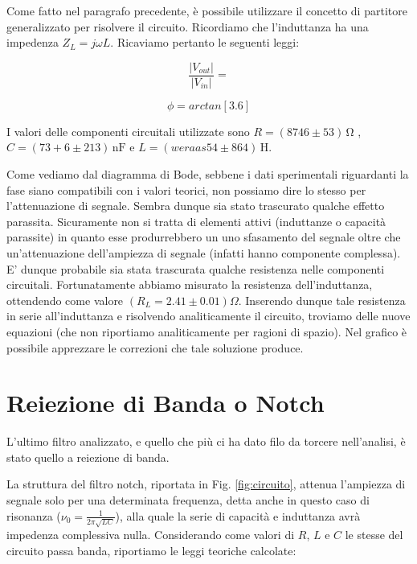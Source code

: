 Come fatto nel paragrafo precedente, è possibile utilizzare il concetto di partitore generalizzato per risolvere il circuito. Ricordiamo che l'induttanza ha una impedenza $Z_L=j\omega L$. Ricaviamo pertanto le seguenti leggi:

\begin{equation}
\frac{|V_{out}|}{|V_{in}|}=
\label{eq:bpfGain}
\end{equation}

\begin{equation}
\phi=arctan[3.6]
\label{eq:bpfPhi}
\end{equation}

I valori delle componenti circuitali utilizzate sono $R=(8746 \pm 53)\,\si{\ohm}$ , $C=(73+6 \pm 213)\,\si{\nano\farad}$ e $L=(weraas54 \pm 864)\,\si{\henry}$.

Come vediamo dal diagramma di Bode, sebbene i dati sperimentali riguardanti la fase siano compatibili con i valori teorici, non possiamo dire lo stesso per l'attenuazione di segnale. Sembra dunque sia stato trascurato qualche effetto parassita. Sicuramente non si tratta di elementi attivi (induttanze o capacità parassite) in quanto esse produrrebbero un uno sfasamento del segnale oltre che un'attenuazione dell'ampiezza di segnale (infatti hanno componente complessa). E' dunque probabile sia stata trascurata qualche resistenza nelle componenti circuitali. Fortunatamente abbiamo misurato la resistenza dell'induttanza, ottendendo come valore $(R_L=2.41\pm 0.01) \Omega$. Inserendo dunque tale resistenza in serie all'induttanza e risolvendo analiticamente il circuito, troviamo delle nuove equazioni (che non riportiamo analiticamente per ragioni di spazio). Nel grafico è possibile apprezzare le correzioni che tale soluzione produce.

\section{Reiezione di Banda o Notch}
L'ultimo filtro analizzato, e quello che più ci ha dato filo da torcere nell'analisi, è stato quello a reiezione di banda.

La struttura del filtro notch, riportata in Fig. \ref{fig:circuito}, attenua l'ampiezza di segnale solo per una determinata frequenza, detta anche in questo caso di risonanza ($\nu_0=\frac{1}{2 \pi \sqrt{LC}}$), alla quale la serie di capacità e induttanza avrà impedenza complessiva nulla. Considerando come valori di $R$, $L$ e $C$ le stesse del circuito passa banda, riportiamo le leggi teoriche calcolate:\\

